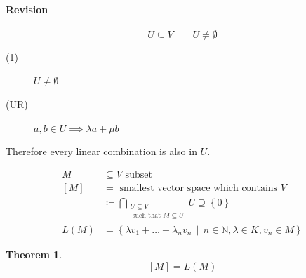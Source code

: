 \documentclass[a4paper,landscape,twocolumn]{article}
\newcommand\set[1]{\left\{#1\right\}}
\newcommand\setdef[2]{\left\{#1\,\middle|\,#2\right\}}
\newtheorem{theorem}{Theorem}[section]
\begin{document}
\begin{mdframed}
\paragraph{Revision}

\[ U \subseteq V \qquad U \neq \emptyset \]
\begin{description}
  \item[(1)] $U \neq \emptyset$
  \item[(UR)] $a, b \in U \implies \lambda a + \mu b$
\end{description}

Therefore every linear combination is also in $U$.

\begin{align*}
    M &\subseteq V \text{ subset} \\
  [M] &= \text{ smallest vector space which contains } V \\
      &\coloneqq \bigcap_{\substack{U \subseteq V \\ \text{ such that } M \subseteq U} } U \supseteq \set{0} \\
 L(M) &= \setdef{\lambda v_1 + \ldots + \lambda_n v_n}{n \in \mathbb N, \lambda \in K, v_n \in M}
\end{align*}
\end{mdframed}

\begin{theorem}
  \[ [M] = L(M) \]
\end{theorem}
\end{document}

